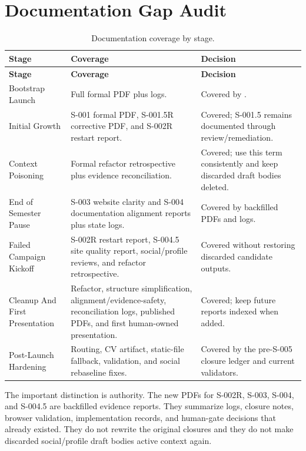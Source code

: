 \documentclass[a4paper,11pt,openany]{report}
\newcommand{\safePath}[1]{\texttt{\detokenize{#1}}}
\begin{document}
\chapter{Documentation Gap Audit}


\begin{longtable}{p{} p{} p{}}
\caption{Documentation coverage by stage.}\\
\toprule
\textbf{Stage} & \textbf{Coverage} & \textbf{Decision} \\
\midrule
\endfirsthead
\toprule
\textbf{Stage} & \textbf{Coverage} & \textbf{Decision} \\
\midrule
\endhead
Bootstrap Launch & Full formal PDF plus logs. & Covered by \safePath{s000-agentic-os-bootstrap.pdf}. \\
Initial Growth & S-001 formal PDF, S-001.5R corrective PDF, and S-002R restart report. & Covered; S-001.5 remains documented through review/remediation. \\
Context Poisoning & Formal refactor retrospective plus evidence reconciliation. & Covered; use this term consistently and keep discarded draft bodies deleted. \\
End of Semester Pause & S-003 website clarity and S-004 documentation alignment reports plus state logs. & Covered by backfilled PDFs and logs. \\
Failed Campaign Kickoff & S-002R restart report, S-004.5 site quality report, social/profile reviews, and refactor retrospective. & Covered without restoring discarded candidate outputs. \\
Cleanup And First Presentation & Refactor, structure simplification, alignment/evidence-safety, reconciliation logs, published PDFs, and first human-owned presentation. & Covered; keep future reports indexed when added. \\
Post-Launch Hardening & Routing, CV artifact, static-file fallback, validation, and social rebaseline fixes. & Covered by the pre-S-005 closure ledger and current validators. \\
\bottomrule
\end{longtable}

The important distinction is authority. The new PDFs for S-002R, S-003, S-004,
and S-004.5 are backfilled evidence reports. They summarize logs, closure notes,
browser validation, implementation records, and human-gate decisions that
already existed. They do not rewrite the original closures and they do not make
discarded social/profile draft bodies active context again.
\end{document}
